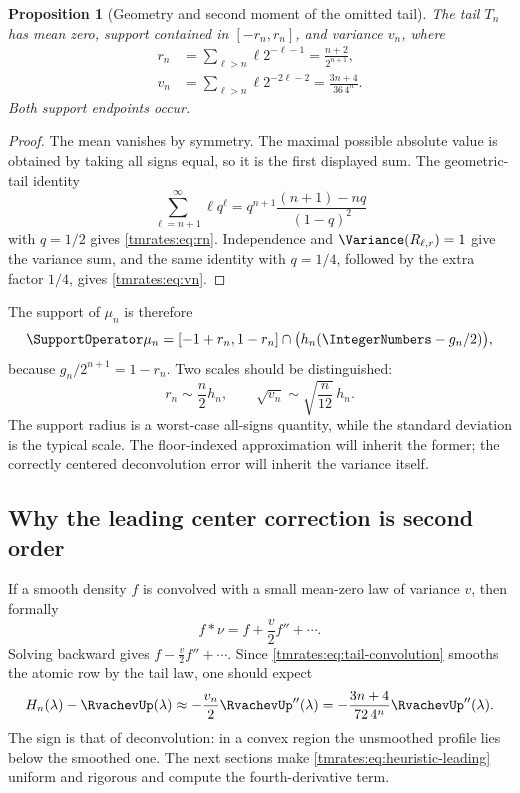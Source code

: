 \documentclass[11pt,oneside]{article}
\newtheorem{proposition}[proposition]{Proposition}
\theoremstyle{definition}
\theoremstyle{remark}
\begin{document}
\begin{proposition}[Geometry and second moment of the omitted tail]
\label{tmrates:prop:tail-moments}
The tail $T_n$ has mean zero, support contained in $[-r_n,r_n]$, and variance $v_n$, where
\begin{align}
 r_n&=\sum_{\ell>n}\ell2^{-\ell-1}
     =\frac{n+2}{2^{n+1}},                                  \label{tmrates:eq:rn}\\
 v_n&=\sum_{\ell>n}\ell2^{-2\ell-2}
     =\frac{3n+4}{36\,4^n}.                                 \label{tmrates:eq:vn}
\end{align}
Both support endpoints occur.
\end{proposition}

\begin{proof}
The mean vanishes by symmetry.  The maximal possible absolute value is obtained by taking
all signs equal, so it is the first displayed sum.  The geometric-tail identity
\[
 \sum_{\ell=n+1}^{\infty}\ell q^\ell
 =q^{n+1}\frac{(n+1)-nq}{(1-q)^2}
\]
with $q=1/2$ gives \eqref{tmrates:eq:rn}.  Independence and $\Variance(R_{\ell,r})=1$ give the variance
sum, and the same identity with $q=1/4$, followed by the extra factor $1/4$, gives
\eqref{tmrates:eq:vn}.
\end{proof}

The support of $\mu_n$ is therefore
\begin{equation}
 \SupportOperator\mu_n=[-1+r_n,1-r_n]\cap\bigl(h_n(\IntegerNumbers-g_n/2)\bigr),  \label{tmrates:eq:support-mun}
\end{equation}
because $g_n/2^{n+1}=1-r_n$.  Two scales should be distinguished:
\begin{equation}
 r_n\sim\frac n2h_n,
 \qquad
 \sqrt{v_n}\sim\sqrt{\frac n{12}}\,h_n.                  \label{tmrates:eq:two-tail-scales}
\end{equation}
The support radius is a worst-case all-signs quantity, while the standard deviation is the
typical scale.  The floor-indexed approximation will inherit the former; the correctly
centered deconvolution error will inherit the variance itself.

\subsection{Why the leading center correction is second order}

If a smooth density $f$ is convolved with a small mean-zero law of variance $v$, then formally
\[
 f*\nu=f+\frac v2f''+\cdots.
\]
Solving backward gives $f-\frac v2f''+\cdots$.  Since \eqref{tmrates:eq:tail-convolution} smooths the
atomic row by the tail law, one should expect
\begin{equation}
 H_n(\lambda)-\RvachevUp(\lambda)
 \approx-\frac{v_n}{2}\RvachevUp''(\lambda)
 =-\frac{3n+4}{72\,4^n}\RvachevUp''(\lambda).                    \label{tmrates:eq:heuristic-leading}
\end{equation}
The sign is that of deconvolution: in a convex region the unsmoothed profile lies below the
smoothed one.  The next sections make \eqref{tmrates:eq:heuristic-leading} uniform and rigorous and
compute the fourth-derivative term.
\end{document}
